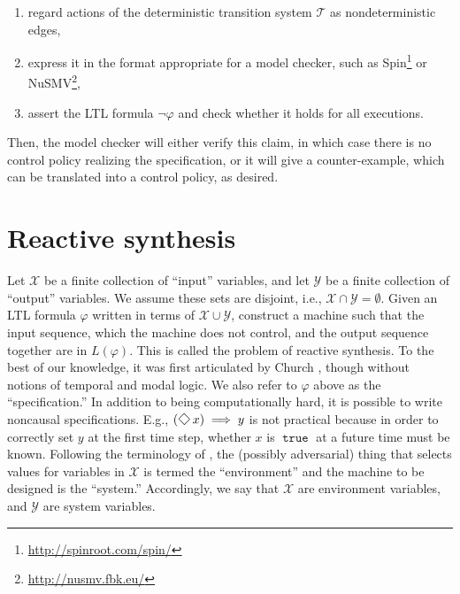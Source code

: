 \documentclass{amsart}
\DeclareMathOperator{\true}{\mathtt{true}}
\theoremstyle{plain}
\theoremstyle{definition}
\theoremstyle{definition}
\begin{document}
\begin{enumerate}
\item regard actions of the deterministic transition system $\mathcal{T}$ as nondeterministic edges,
\item express it in the format appropriate for a model checker, such as Spin\footnote{\url{http://spinroot.com/spin/}} or NuSMV\footnote{\url{http://nusmv.fbk.eu/}},
\item assert the LTL formula $\neg \varphi$ and check whether it holds for all executions.
\end{enumerate}
Then, the model checker will either verify this claim, in which case there is no
control policy realizing the specification, or it will give a counter-example,
which can be translated into a control policy, as desired.


\section{Reactive synthesis}\label{sec:reactsynth}

Let $\mathcal{X}$ be a finite collection of ``input'' variables, and let
$\mathcal{Y}$ be a finite collection of ``output'' variables.  We assume these
sets are disjoint, i.e., $\mathcal{X}\cap \mathcal{Y} = \emptyset$.
Given an LTL formula $\varphi$ written in terms of $\mathcal{X}\cup
\mathcal{Y}$, construct a machine such that the input sequence, which the
machine does not control, and the output sequence together are in $L(\varphi)$.
This is called the problem of reactive synthesis. To the best of our knowledge,
it was first articulated by Church \cite{Church1962}, though without notions of
temporal and modal logic.
We also refer to $\varphi$ above as the
``specification.''  In addition to being computationally hard, it is possible to
write noncausal specifications.  E.g., $(\Feventually x) \implies y$ is not practical
because in order to correctly set $y$ at the first time step, whether $x$ is $\true$
at a future time must be known.  Following the terminology of
\cite{PnueliR1989}, the (possibly adversarial) thing that selects values for
variables in $\mathcal{X}$ is termed the ``environment'' and the machine to be
designed is the ``system.''  Accordingly, we say that $\mathcal{X}$ are
environment variables, and $\mathcal{Y}$ are system variables.
\end{document}
